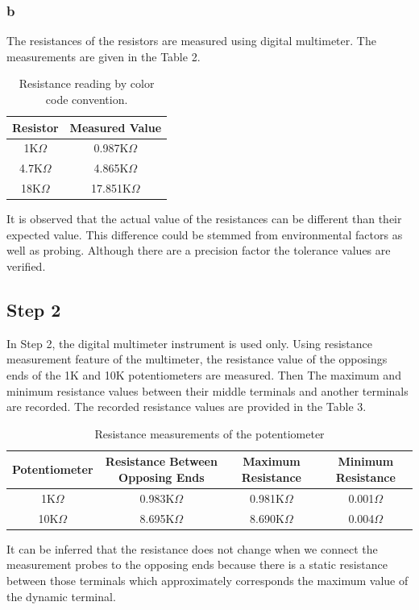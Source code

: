 \documentclass[letterpaper,12pt]{article}
\begin{document}
\subsubsection{b} 
The resistances of the resistors are measured using digital multimeter. The measurements are given in the Table 2. 
\begin{table}[H]
	\begin{center}
		\begin{tabular}{||c | c ||} 
		 \hline
		 Resistor & Measured Value \\ [0.5ex] 
		 \hline\hline
		 1K\( \Omega \) & 0.987K\( \Omega \)  \\ 
		 \hline
	     4.7K\( \Omega \) & 4.865K\( \Omega \)   \\
		 \hline
		 18K\( \Omega \) & 17.851K\( \Omega \)  \\ [1ex] 
		 \hline
		\end{tabular}
	\end{center}
	\caption{Resistance reading by color code convention.}
	\end{table}
	

It is observed that the actual value of the resistances can be different than their expected value. This difference could be stemmed from environmental factors as well as probing. Although there are a precision factor the tolerance values are verified. 

\subsection{Step 2}
In Step 2, the digital multimeter instrument  is used only. Using resistance measurement feature of the multimeter, the resistance value of the opposings ends of the 1K and 10K potentiometers are measured. Then The maximum and minimum resistance values between their middle terminals and another terminals are recorded.
The recorded resistance values are provided in the Table 3.
\begin{table}[H]
	\begin{center}
		\begin{tabular}{|| c | c | c | c ||} 
		 \hline
		 Potentiometer & Resistance Between Opposing Ends &  Maximum Resistance & Minimum Resistance\\ [0.5ex] 
		 \hline\hline
		 1K\( \Omega \) & 0.983K\( \Omega \) & 0.981K\( \Omega \) & 0.001\( \Omega \) \\ 
		 \hline
	     10K\( \Omega \) & 8.695K\( \Omega \) & 8.690K\( \Omega \) & 0.004\( \Omega \)  \\
		 \hline
		\end{tabular}
	\end{center}
	\caption{Resistance measurements of the potentiometer}
	\end{table}
It can be inferred that the resistance does not change when we connect the measurement probes to the opposing ends because there is a static resistance between those terminals which approximately corresponds the maximum value of the dynamic terminal.  
\end{document}
